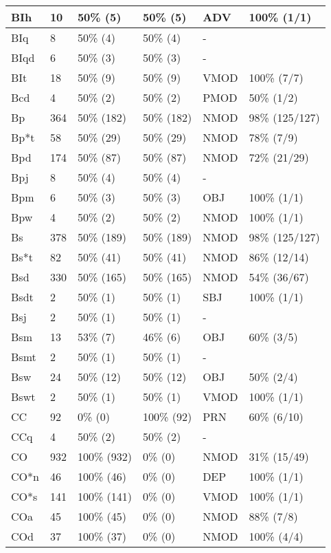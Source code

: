 \begin{figure*}
\begin{tabular}{|l|l|l|l||l|l|}
\hline
 BIh & 10 & 50\% (5) & 50\% (5) & ADV & 100\% (1/1) \\ 
\hline
 BIq & 8 & 50\% (4) & 50\% (4) & - &  \\ 
\hline
 BIqd & 6 & 50\% (3) & 50\% (3) & - &  \\ 
\hline
 BIt & 18 & 50\% (9) & 50\% (9) & VMOD & 100\% (7/7) \\ 
\hline
 Bcd & 4 & 50\% (2) & 50\% (2) & PMOD & 50\% (1/2) \\ 
\hline
 Bp & 364 & 50\% (182) & 50\% (182) & NMOD & 98\% (125/127) \\ 
\hline
 Bp*t & 58 & 50\% (29) & 50\% (29) & NMOD & 78\% (7/9) \\ 
\hline
 Bpd & 174 & 50\% (87) & 50\% (87) & NMOD & 72\% (21/29) \\ 
\hline
 Bpj & 8 & 50\% (4) & 50\% (4) & - &  \\ 
\hline
 Bpm & 6 & 50\% (3) & 50\% (3) & OBJ & 100\% (1/1) \\ 
\hline
 Bpw & 4 & 50\% (2) & 50\% (2) & NMOD & 100\% (1/1) \\ 
\hline
 Bs & 378 & 50\% (189) & 50\% (189) & NMOD & 98\% (125/127) \\ 
\hline
 Bs*t & 82 & 50\% (41) & 50\% (41) & NMOD & 86\% (12/14) \\ 
\hline
 Bsd & 330 & 50\% (165) & 50\% (165) & NMOD & 54\% (36/67) \\ 
\hline
 Bsdt & 2 & 50\% (1) & 50\% (1) & SBJ & 100\% (1/1) \\ 
\hline
 Bsj & 2 & 50\% (1) & 50\% (1) & - &  \\ 
\hline
 Bsm & 13 & 53\% (7) & 46\% (6) & OBJ & 60\% (3/5) \\ 
\hline
 Bsmt & 2 & 50\% (1) & 50\% (1) & - &  \\ 
\hline
 Bsw & 24 & 50\% (12) & 50\% (12) & OBJ & 50\% (2/4) \\ 
\hline
 Bswt & 2 & 50\% (1) & 50\% (1) & VMOD & 100\% (1/1) \\ 
\hline
 CC & 92 & 0\% (0) & 100\% (92) & PRN & 60\% (6/10) \\ 
\hline
 CCq & 4 & 50\% (2) & 50\% (2) & - &  \\ 
\hline
 CO & 932 & 100\% (932) & 0\% (0) & NMOD & 31\% (15/49) \\ 
\hline
 CO*n & 46 & 100\% (46) & 0\% (0) & DEP & 100\% (1/1) \\ 
\hline
 CO*s & 141 & 100\% (141) & 0\% (0) & VMOD & 100\% (1/1) \\ 
\hline
 COa & 45 & 100\% (45) & 0\% (0) & NMOD & 88\% (7/8) \\ 
\hline
 COd & 37 & 100\% (37) & 0\% (0) & NMOD & 100\% (4/4) \\ 
\hline
\end{tabular}
\end{figure*}
